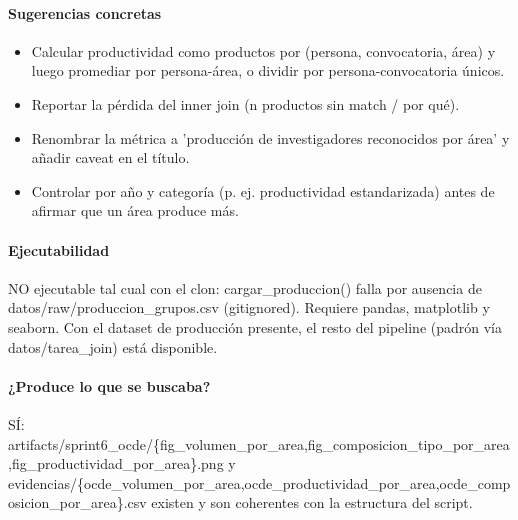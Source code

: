 \paragraph{Sugerencias concretas}
\begin{itemize}
  \item Calcular productividad como productos por (persona, convocatoria, área) y luego promediar por persona-área, o dividir por persona-convocatoria únicos.
  \item Reportar la pérdida del inner join (n productos sin match / por qué).
  \item Renombrar la métrica a 'producción de investigadores reconocidos por área' y añadir caveat en el título.
  \item Controlar por año y categoría (p. ej. productividad estandarizada) antes de afirmar que un área produce más.
\end{itemize}

\paragraph{Ejecutabilidad}
NO ejecutable tal cual con el clon: cargar\_produccion() falla por ausencia de datos/raw/produccion\_grupos.csv (gitignored). Requiere pandas, matplotlib y seaborn. Con el dataset de producción presente, el resto del pipeline (padrón vía datos/tarea\_join) está disponible.

\paragraph{¿Produce lo que se buscaba?}
SÍ: artifacts/sprint6\_ocde/\{fig\_volumen\_por\_area,fig\_composicion\_tipo\_por\_area,fig\_productividad\_por\_area\}.png y evidencias/\{ocde\_volumen\_por\_area,ocde\_productividad\_por\_area,ocde\_composicion\_por\_area\}.csv existen y son coherentes con la estructura del script.

